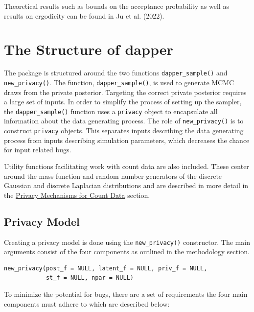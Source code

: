 Theoretical results such as bounds on the acceptance probability as well as
results on ergodicity can be found in Ju et al. (2022).

\hypertarget{the-structure-of-dapper}{%
\section{The Structure of dapper}\label{the-structure-of-dapper}}

The  package is structured around the two functions \texttt{dapper\_sample()} and
\texttt{new\_privacy()}. The function, \texttt{dapper\_sample()}, is used to generate MCMC draws from
the private posterior. Targeting the correct private posterior requires
a large set of inputs. In order to simplify the process of setting up the
sampler, the \texttt{dapper\_sample()} function uses a \texttt{privacy} object to encapsulate
all information about the data generating process. The role of \texttt{new\_privacy()} is to
construct \texttt{privacy} objects. This separates inputs describing the data generating
process from inputs describing simulation parameters, which decreases
the chance for input related bugs.

Utility functions facilitating work with count data are also included.
These center around the mass function and random number generators of the
discrete Gaussian and discrete Laplacian distributions and are described
in more detail in the \protect\hyperlink{privacy-mechanisms-for-count-data}{Privacy Mechanisms for Count Data} section.

\hypertarget{privacy-model}{%
\subsection{Privacy Model}\label{privacy-model}}

Creating a privacy model is done using the \texttt{new\_privacy()} constructor. The
main arguments consist of the four components as outlined in the methodology
section.

\begin{verbatim}
new_privacy(post_f = NULL, latent_f = NULL, priv_f = NULL,
            st_f = NULL, npar = NULL)
\end{verbatim}

To minimize the potential for bugs, there are a set of requirements the four main components
must adhere to which are described below:

